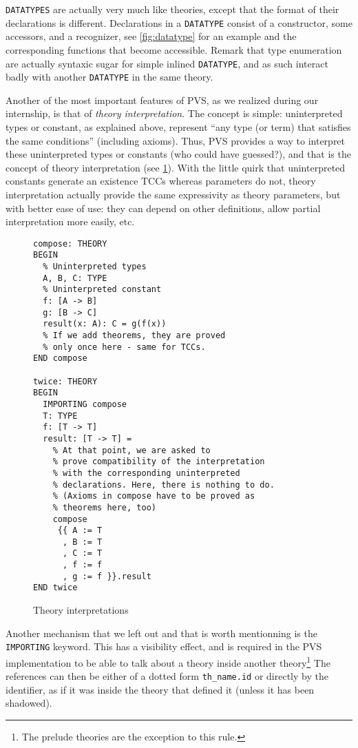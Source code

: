 \documentclass[utf8,a4paper]{article}
\begin{document}
\verb!DATATYPES! are actually very much like theories, except that the
format of their declarations is different. Declarations in a
\verb!DATATYPE! consist of a constructor, some accessors, and a
recognizer, see \cref{fig:datatype} for an example and the
corresponding functions that become accessible. Remark that type
enumeration are actually syntaxic sugar for simple inlined
\verb!DATATYPE!, and as such interact badly with another
\verb!DATATYPE! in the same theory.

Another of the most important features of PVS, as we realized during
our internship, is that of \textit{theory interpretation}. The concept
is simple: uninterpreted types or constant, as explained above,
represent ``any type (or term) that satisfies the same conditions''
(including axioms). Thus, PVS provides a way to interpret these
uninterpreted types or constants (who could have guessed?), and that
is the concept of theory interpretation (see \cref{fig:interp}). With
the little quirk that uninterpreted constants generate an existence
TCCs whereas parameters do not, theory interpretation actually provide
the same expressivity as theory parameters, but with better ease of
use: they can depend on other definitions, allow partial
interpretation more easily, etc.

\begin{figure}
  \centering
  \begin{verbatim}
compose: THEORY
BEGIN
  % Uninterpreted types
  A, B, C: TYPE
  % Uninterpreted constant
  f: [A -> B]
  g: [B -> C]
  result(x: A): C = g(f(x))
  % If we add theorems, they are proved
  % only once here - same for TCCs.
END compose

twice: THEORY
BEGIN
  IMPORTING compose
  T: TYPE
  f: [T -> T]
  result: [T -> T] =
    % At that point, we are asked to
    % prove compatibility of the interpretation
    % with the corresponding uninterpreted
    % declarations. Here, there is nothing to do.
    % (Axioms in compose have to be proved as
    % theorems here, too)
    compose
     {{ A := T
      , B := T
      , C := T
      , f := f
      , g := f }}.result
END twice
  \end{verbatim}
  \caption{Theory interpretations}
  \label{fig:interp}
\end{figure}

Another mechanism that we left out and that is worth mentionning is
the \verb!IMPORTING! keyword. This has a visibility effect, and is
required in the PVS implementation to be able to talk about a theory
inside another theory\footnote{The prelude theories are the exception
  to this rule.} The references can then be either of a dotted form
\verb!th_name.id! or directly by the identifier, as if it was inside
the theory that defined it (unless it has been shadowed).
\end{document}
